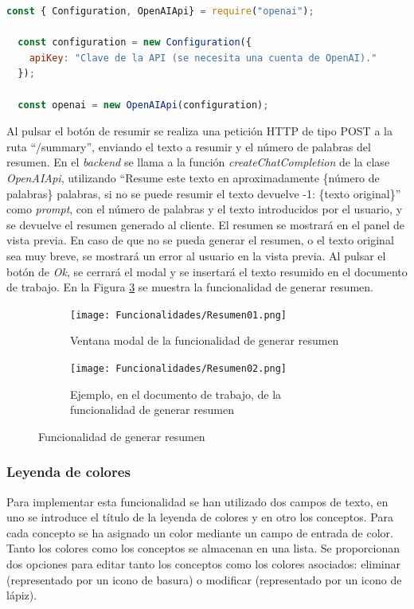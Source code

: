 \begin{lstlisting}[label=fig:impresumenconfiguracion, caption=Configuración de la clase \textit{OpenAIApi}., language=JavaScript]
  const { Configuration, OpenAIApi} = require("openai");

  const configuration = new Configuration({
    apiKey: "Clave de la API (se necesita una cuenta de OpenAI)."
  });

  const openai = new OpenAIApi(configuration);
\end{lstlisting}

Al pulsar el botón de resumir se realiza una petición HTTP de tipo POST a la ruta ``/summary'', enviando el texto a resumir y el número de palabras del resumen. En el \textit{backend} se llama a la función \textit{createChatCompletion} de la clase \textit{OpenAIApi}, utilizando ``Resume este texto en aproximadamente \{número de palabras\} palabras, si no se puede resumir el texto devuelve -1: \{texto original\}'' como \textit{prompt}, con el número de palabras y el texto introducidos por el usuario, y se devuelve el resumen generado al cliente. El resumen se mostrará en el panel de vista previa. En caso de que no se pueda generar el resumen, o el texto original sea muy breve, se mostrará un error al usuario en la vista previa. Al pulsar el botón de \textit{Ok}, se cerrará el modal y se insertará el texto resumido en el documento de trabajo. En la Figura \ref{fig:impresumen} se muestra la funcionalidad de generar resumen.

\begin{figure}[ht!]
  \centering
  \begin{subfigure}{\textwidth}
    \centering
    \texttt{[image: Funcionalidades/Resumen01.png]}
    \caption{Ventana modal de la funcionalidad de generar resumen}
    \label{fig:impresumen01}
  \end{subfigure}

  \begin{subfigure}{\textwidth}
    \centering
    \texttt{[image: Funcionalidades/Resumen02.png]}
    \caption{Ejemplo, en el documento de trabajo, de la funcionalidad de generar resumen}
    \label{fig:impresumen02}
  \end{subfigure}

  \caption{Funcionalidad de generar resumen}
  \label{fig:impresumen}
\end{figure}

\subsubsection{Leyenda de colores}
\label{sec:leyendaColores}
Para implementar esta funcionalidad se han utilizado dos campos de texto, en uno se introduce el título de la leyenda de colores y en otro los conceptos. Para cada concepto se ha asignado un color mediante un campo de entrada de color. Tanto los colores como los conceptos se almacenan en una lista. Se proporcionan dos opciones para editar tanto los conceptos como los colores asociados: eliminar (representado por un icono de basura) o modificar (representado por un icono de lápiz).


